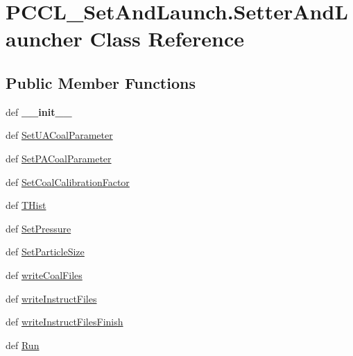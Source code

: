 \hypertarget{classPCCL__SetAndLaunch_1_1SetterAndLauncher}{\section{\-P\-C\-C\-L\-\_\-\-Set\-And\-Launch.\-Setter\-And\-Launcher \-Class \-Reference}
\label{classPCCL__SetAndLaunch_1_1SetterAndLauncher}
}
\subsection*{\-Public \-Member \-Functions}
\begin{DoxyCompactItemize}
\item 
\hypertarget{classPCCL__SetAndLaunch_1_1SetterAndLauncher_aa03f8556a5cb80e4f52d2b5b3c39d975}{def {\bfseries \-\_\-\-\_\-init\-\_\-\-\_\-}}\label{classPCCL__SetAndLaunch_1_1SetterAndLauncher_aa03f8556a5cb80e4f52d2b5b3c39d975}

\item 
def \hyperlink{classPCCL__SetAndLaunch_1_1SetterAndLauncher_af3f49d80779a5ea202639fb2a0509676}{\-Set\-U\-A\-Coal\-Parameter}
\item 
def \hyperlink{classPCCL__SetAndLaunch_1_1SetterAndLauncher_a30eef6ccc6e5eb62188133bb555b68cf}{\-Set\-P\-A\-Coal\-Parameter}
\item 
def \hyperlink{classPCCL__SetAndLaunch_1_1SetterAndLauncher_a9cf2f451cc34a05c0f0590acbd0fce41}{\-Set\-Coal\-Calibration\-Factor}
\item 
def \hyperlink{classPCCL__SetAndLaunch_1_1SetterAndLauncher_a49fe3ae74111408b23dc7ee500fed547}{\-T\-Hist}
\item 
def \hyperlink{classPCCL__SetAndLaunch_1_1SetterAndLauncher_ae1127cd29781ebb1274c75ef065c3f18}{\-Set\-Pressure}
\item 
def \hyperlink{classPCCL__SetAndLaunch_1_1SetterAndLauncher_ab92a8919c69b10cf765a3fe1190b8710}{\-Set\-Particle\-Size}
\item 
def \hyperlink{classPCCL__SetAndLaunch_1_1SetterAndLauncher_acaaf7e0e2ac83d40fcae238cd412d7f6}{write\-Coal\-Files}
\item 
def \hyperlink{classPCCL__SetAndLaunch_1_1SetterAndLauncher_ac57f3501142f6cdf64ad0a0c922d2bac}{write\-Instruct\-Files}
\item 
def \hyperlink{classPCCL__SetAndLaunch_1_1SetterAndLauncher_a036a139dc6a77642ba3af0351b3d1391}{write\-Instruct\-Files\-Finish}
\item 
def \hyperlink{classPCCL__SetAndLaunch_1_1SetterAndLauncher_a501a8ba136753e46889143d32227a170}{\-Run}
\end{DoxyCompactItemize}

